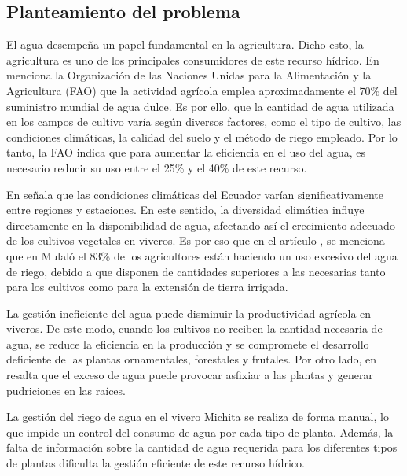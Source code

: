 \subsection{Planteamiento del problema}

El agua desempeña un papel fundamental en la agricultura. Dicho esto, la
agricultura es uno de los principales consumidores de este recurso hídrico. En \cite{noauthor_gestion_2018} menciona la Organización de las
Naciones Unidas para la Alimentación y la Agricultura (FAO) que la actividad
agrícola emplea aproximadamente el 70\% del suministro mundial de agua dulce.
Es por ello, que la cantidad de agua utilizada en los campos de cultivo varía
según diversos factores, como el tipo de cultivo, las condiciones climáticas,
la calidad del suelo y el método de riego empleado. Por lo tanto, la FAO
\cite{noauthor_gestion_2018} indica que para aumentar la eficiencia en el uso
del agua, es necesario reducir su uso entre el 25\% y el 40\% de este recurso.

\bigbreak
En \cite{temperatura_nodate} señala que las condiciones climáticas del Ecuador varían significativamente entre regiones y estaciones. En este sentido, la diversidad climática influye directamente en la disponibilidad de agua, afectando así el crecimiento adecuado de los cultivos vegetales en viveros. Es por eso que en el artículo \cite{c_estudio_2018}, se menciona que en Mulaló el 83\% de los agricultores están haciendo un uso excesivo del agua de riego, debido a que disponen de cantidades superiores a las necesarias tanto para los cultivos como para la extensión de tierra irrigada.

\bigbreak
La gestión ineficiente del agua puede disminuir la productividad agrícola en viveros. De este modo, cuando los cultivos no reciben la cantidad necesaria de agua, se reduce la eficiencia en la producción y se compromete el desarrollo deficiente de las plantas ornamentales, forestales y frutales. Por otro lado, en \cite{luz_cultivo_2014} resalta que el exceso de agua puede provocar asfixiar a las plantas y generar pudriciones en las raíces.

\bigbreak
La gestión del riego de agua en el vivero Michita se realiza de forma manual, lo que impide un control del consumo de agua por cada tipo de planta. Además, la falta de información  sobre la cantidad de agua requerida para los diferentes tipos de plantas dificulta la gestión eficiente de este recurso hídrico. 
